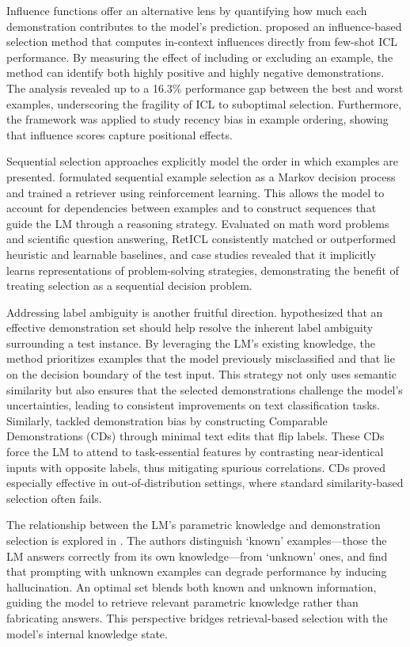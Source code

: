 \documentclass[11pt]{article}
\begin{document}
Influence functions offer an alternative lens by quantifying how much each demonstration contributes to the model's prediction. \cite{ref71} proposed an influence-based selection method that computes in-context influences directly from few-shot ICL performance. By measuring the effect of including or excluding an example, the method can identify both highly positive and highly negative demonstrations. The analysis revealed up to a 16.3\% performance gap between the best and worst examples, underscoring the fragility of ICL to suboptimal selection. Furthermore, the framework was applied to study recency bias in example ordering, showing that influence scores capture positional effects.

Sequential selection approaches explicitly model the order in which examples are presented. \cite{ref72} formulated sequential example selection as a Markov decision process and trained a retriever using reinforcement learning. This allows the model to account for dependencies between examples and to construct sequences that guide the LM through a reasoning strategy. Evaluated on math word problems and scientific question answering, RetICL consistently matched or outperformed heuristic and learnable baselines, and case studies revealed that it implicitly learns representations of problem-solving strategies, demonstrating the benefit of treating selection as a sequential decision problem.

Addressing label ambiguity is another fruitful direction. \cite{ref73} hypothesized that an effective demonstration set should help resolve the inherent label ambiguity surrounding a test instance. By leveraging the LM's existing knowledge, the method prioritizes examples that the model previously misclassified and that lie on the decision boundary of the test input. This strategy not only uses semantic similarity but also ensures that the selected demonstrations challenge the model's uncertainties, leading to consistent improvements on text classification tasks. Similarly, \cite{ref46} tackled demonstration bias by constructing Comparable Demonstrations (CDs) through minimal text edits that flip labels. These CDs force the LM to attend to task-essential features by contrasting near-identical inputs with opposite labels, thus mitigating spurious correlations. CDs proved especially effective in out-of-distribution settings, where standard similarity-based selection often fails.

The relationship between the LM's parametric knowledge and demonstration selection is explored in \cite{ref74}. The authors distinguish `known' examples---those the LM answers correctly from its own knowledge---from `unknown' ones, and find that prompting with unknown examples can degrade performance by inducing hallucination. An optimal set blends both known and unknown information, guiding the model to retrieve relevant parametric knowledge rather than fabricating answers. This perspective bridges retrieval-based selection with the model's internal knowledge state.
\end{document}
